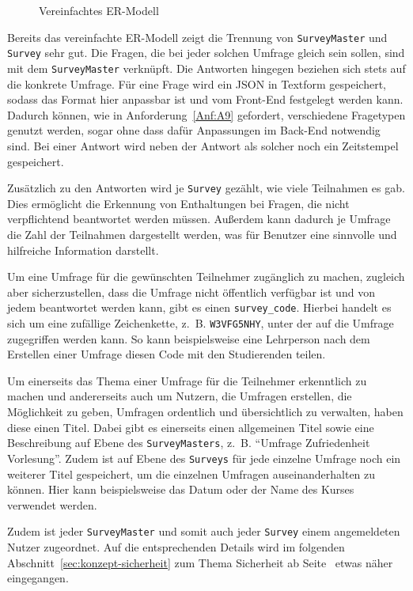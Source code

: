 \begin{figure}[ht]
	\centering
	\def\svgscale{0.72}
	\graphicspath{{img/backend/database/}}
	\scriptsize{}
	\caption{Vereinfachtes \acs{ER-Modell}}
	\label{fig:er-model-simplified}
\end{figure}

Bereits das vereinfachte \acs{ER-Modell} zeigt die Trennung von \texttt{SurveyMaster} und \texttt{Survey} sehr gut.
Die Fragen, die bei jeder solchen Umfrage gleich sein sollen, sind mit dem \texttt{SurveyMaster} verknüpft.
Die Antworten hingegen beziehen sich stets auf die konkrete Umfrage.
Für eine Frage wird ein \acs{JSON} in Textform gespeichert, sodass das Format hier anpassbar ist und vom Front-End festgelegt werden kann.
Dadurch können, wie in Anforderung~\ref{Anf:A9} gefordert, verschiedene Fragetypen genutzt werden, sogar ohne dass dafür Anpassungen im Back-End notwendig sind.
Bei einer Antwort wird neben der Antwort als solcher noch ein Zeitstempel gespeichert.

Zusätzlich zu den Antworten wird je \texttt{Survey} gezählt, wie viele Teilnahmen es gab.
Dies ermöglicht die Erkennung von Enthaltungen bei Fragen, die nicht verpflichtend beantwortet werden müssen.
Außerdem kann dadurch je Umfrage die Zahl der Teilnahmen dargestellt werden, was für Benutzer eine sinnvolle und hilfreiche Information darstellt.

Um eine Umfrage für die gewünschten Teilnehmer zugänglich zu machen, zugleich aber sicherzustellen, dass die Umfrage nicht öffentlich verfügbar ist und von jedem beantwortet werden kann, gibt es einen \texttt{survey\_code}.
Hierbei handelt es sich um eine zufällige Zeichenkette, z.~B. \texttt{W3VFG5NHY}, unter der auf die Umfrage zugegriffen werden kann.
So kann beispielsweise eine Lehrperson nach dem Erstellen einer Umfrage diesen Code mit den Studierenden teilen.

Um einerseits das Thema einer Umfrage für die Teilnehmer erkenntlich zu machen und andererseits auch um Nutzern, die Umfragen erstellen, die Möglichkeit zu geben, Umfragen ordentlich und übersichtlich zu verwalten, haben diese einen Titel.
Dabei gibt es einerseits einen allgemeinen Titel sowie eine Beschreibung auf Ebene des \texttt{SurveyMasters}, z.~B. \enquote{Umfrage Zufriedenheit Vorlesung}.
Zudem ist auf Ebene des \texttt{Surveys} für jede einzelne Umfrage noch ein weiterer Titel gespeichert, um die einzelnen Umfragen auseinanderhalten zu können.
Hier kann beispielsweise das Datum oder der Name des Kurses verwendet werden.

Zudem ist jeder \texttt{SurveyMaster} und somit auch jeder \texttt{Survey} einem angemeldeten Nutzer zugeordnet.
Auf die entsprechenden Details wird im folgenden Abschnitt~\ref{sec:konzept-sicherheit} zum Thema Sicherheit ab Seite~\pageref{sec:authentifizierung} etwas näher eingegangen.
